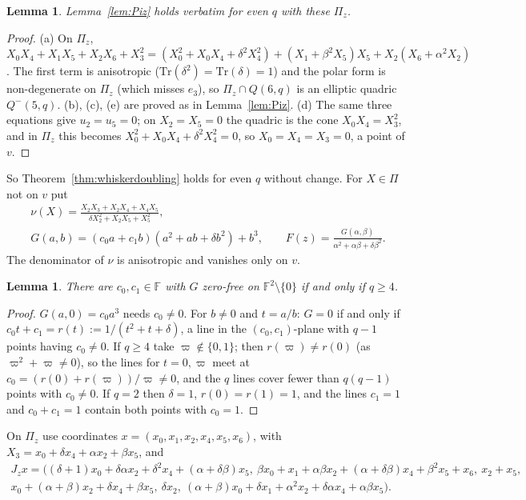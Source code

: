 \documentclass[11pt]{amsart}
\newtheorem{lemma}[theorem]{Lemma}
\theoremstyle{definition}
\theoremstyle{remark}
\numberwithin{equation}{section}
\newcommand{\F}{\mathbb F}
\newcommand{\Tr}{\mathrm{Tr}}
\begin{document}
\begin{lemma}\label{lem:Piz-even}
Lemma~\ref{lem:Piz} holds verbatim for even $q$ with these $\Pi_z$.
\end{lemma}

\begin{proof}
(a) On $\Pi_z$, $X_0X_4+X_1X_5+X_2X_6+X_3^2=(X_0^2+X_0X_4+\delta^2X_4^2)+(X_1+\beta^2X_5)X_5+X_2(X_6+\alpha^2X_2)$. The first
term is anisotropic ($\Tr(\delta^2)=\Tr(\delta)=1$) and the polar form is non-degenerate on $\Pi_z$ (which misses $e_3$), so
$\Pi_z\cap Q(6,q)$ is an elliptic quadric $Q^-(5,q)$. (b), (c), (e) are proved as in Lemma~\ref{lem:Piz}. (d) The same
three equations give $u_2=u_5=0$; on $X_2=X_5=0$ the quadric is the cone $X_0X_4=X_3^2$, and in $\Pi_z$ this becomes
$X_0^2+X_0X_4+\delta^2X_4^2=0$, so $X_0=X_4=X_3=0$, a point of $v$.
\end{proof}

So Theorem~\ref{thm:whiskerdoubling} holds for even $q$ without change. For $X\in\Pi$ not on $v$ put
\begin{gather*}
\nu(X)=\frac{X_2X_3+X_2X_4+X_4X_5}{\delta X_2^2+X_2X_5+X_5^2},\\
G(a,b)=(c_0a+c_1b)(a^2+ab+\delta b^2)+b^3,\qquad F(z)=\frac{G(\alpha,\beta)}{\alpha^2+\alpha\beta+\delta\beta^2}.
\end{gather*}
The denominator of $\nu$ is anisotropic and vanishes only on $v$.

\begin{lemma}\label{lem:cubic-even}
There are $c_0,c_1\in\F$ with $G$ zero-free on $\F^2\setminus\{0\}$ if and only if $q\ge4$.
\end{lemma}

\begin{proof}
$G(a,0)=c_0a^3$ needs $c_0\ne0$. For $b\ne0$ and $t=a/b$: $G=0$ if and only if $c_0t+c_1=r(t):=1/(t^2+t+\delta)$, a line in
the $(c_0,c_1)$-plane with $q-1$ points having $c_0\ne0$. If $q\ge4$ take $\varpi\notin\{0,1\}$; then $r(\varpi)\ne r(0)$
(as $\varpi^2+\varpi\ne0$), so the lines for $t=0,\varpi$ meet at $c_0=(r(0)+r(\varpi))/\varpi\ne0$, and the $q$ lines cover
fewer than $q(q-1)$ points with $c_0\ne0$. If $q=2$ then $\delta=1$, $r(0)=r(1)=1$, and the lines $c_1=1$ and $c_0+c_1=1$
contain both points with $c_0=1$.
\end{proof}

On $\Pi_z$ use coordinates $x=(x_0,x_1,x_2,x_4,x_5,x_6)$, with $X_3=x_0+\delta x_4+\alpha x_2+\beta x_5$, and
\begin{multline*}
J_zx=\bigl((\delta+1)x_0+\delta\alpha x_2+\delta^2x_4+(\alpha+\delta\beta)x_5,\ \beta x_0+x_1+\alpha\beta x_2+(\alpha+\delta\beta)x_4+\beta^2x_5+x_6,\
x_2+x_5,\\ x_0+(\alpha+\beta)x_2+\delta x_4+\beta x_5,\ \delta x_2,\ (\alpha+\beta)x_0+\delta x_1+\alpha^2x_2+\delta\alpha x_4+\alpha\beta
x_5\bigr).
\end{multline*}
\end{document}
